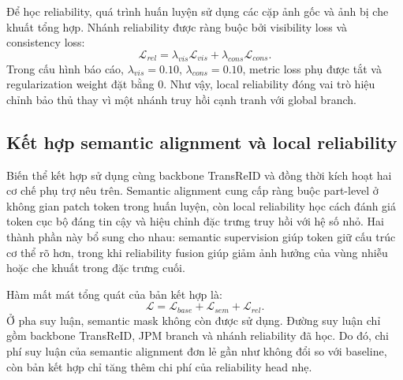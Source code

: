 Để học reliability, quá trình huấn luyện sử dụng các cặp ảnh gốc và ảnh bị che
khuất tổng hợp. Nhánh reliability được ràng buộc bởi visibility loss và
consistency loss:
\[
\mathcal{L}_{rel}
= \lambda_{vis}\mathcal{L}_{vis}
+ \lambda_{cons}\mathcal{L}_{cons}.
\]
Trong cấu hình báo cáo, \(\lambda_{vis}=0.10\),
\(\lambda_{cons}=0.10\), metric loss phụ được tắt và regularization weight đặt
bằng $0$. Như vậy, local reliability đóng vai trò hiệu chỉnh bảo thủ thay vì
một nhánh truy hồi cạnh tranh với global branch.

\subsection{Kết hợp semantic alignment và local reliability}

Biến thể kết hợp sử dụng cùng backbone TransReID và đồng thời kích hoạt hai cơ
chế phụ trợ nêu trên. Semantic alignment cung cấp ràng buộc part-level ở không
gian patch token trong huấn luyện, còn local reliability học cách đánh giá token
cục bộ đáng tin cậy và hiệu chỉnh đặc trưng truy hồi với hệ số nhỏ. Hai thành
phần này bổ sung cho nhau: semantic supervision giúp token giữ cấu trúc cơ thể
rõ hơn, trong khi reliability fusion giúp giảm ảnh hưởng của vùng nhiễu hoặc
che khuất trong đặc trưng cuối.

Hàm mất mát tổng quát của bản kết hợp là:
\[
\mathcal{L}
= \mathcal{L}_{base}
+ \mathcal{L}_{sem}
+ \mathcal{L}_{rel}.
\]
Ở pha suy luận, semantic mask không còn được sử dụng. Đường suy luận chỉ gồm
backbone TransReID, JPM branch và nhánh reliability đã học. Do đó, chi phí suy
luận của semantic alignment đơn lẻ gần như không đổi so với baseline, còn bản
kết hợp chỉ tăng thêm chi phí của reliability head nhẹ.
